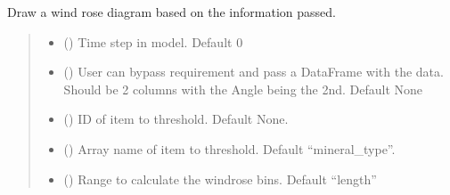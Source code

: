 \documentclass[letterpaper,10pt,english]{sphinxmanual}
\begin{document}
\begin{fulllineitems}
\begin{fulllineitems}
\end{fulllineitems}


\begin{fulllineitems}
\label{\detokenize{pyfdempp:pyfdempp.pyfdempp.Model.draw_rose_diagram}}
\pysigstartsignatures
{}
\pysigstopsignatures
\sphinxAtStartPar
Draw a wind rose diagram based on the information passed.
\begin{quote}\begin{description}
\begin{itemize}
\item {} 
\sphinxAtStartPar
{} () \textendash{} Time step in model. Default 0

\item {} 
\sphinxAtStartPar
{} () \textendash{} User can bypass requirement and pass a DataFrame with the data. Should be 2 columns with the Angle being the 2nd. Default None

\item {} 
\sphinxAtStartPar
{} () \textendash{} ID of item to threshold. Default None.

\item {} 
\sphinxAtStartPar
{} () \textendash{} Array name of item to threshold. Default “mineral\_type”.

\item {} 
\sphinxAtStartPar
{} () \textendash{} Range to calculate the windrose bins. Default “length”


\end{itemize}
\end{description}
\end{quote}
\end{fulllineitems}
\end{fulllineitems}
\end{document}
